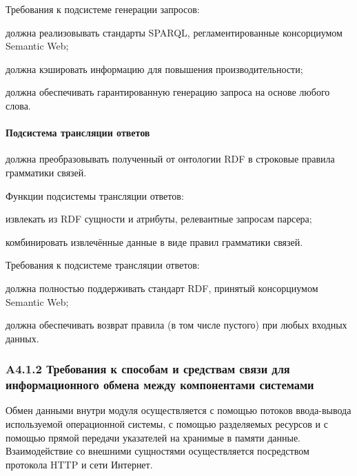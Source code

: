 Требования к подсистеме генерации запросов:
\begin{list}{}{\leftmargin=1.5cm}
  \item должна реализовывать стандарты SPARQL, регламентированные консорциумом Semantic Web;
  \item должна кэшировать информацию для повышения производительности;
  \item должна обеспечивать гарантированную генерацию запроса на основе любого слова.
\end{list}

\paragraph{Подсистема трансляции ответов} должна преобразовывать полученный от онтологии RDF в строковые правила грамматики связей.

Функции подсистемы трансляции ответов:
\begin{list}{}{\leftmargin=1.5cm}
  \item извлекать из RDF сущности и атрибуты, релевантные запросам парсера;
  \item комбинировать извлечённые данные в виде правил грамматики связей.
\end{list}

Требования к подсистеме трансляции ответов:
\begin{list}{}{\leftmargin=1.5cm}
  \item должна полностью поддерживать стандарт RDF, принятый консорциумом Semantic Web;
  \item должна обеспечивать возврат правила (в том числе пустого) при любых входных данных.
\end{list}

\subsubsection*{A4.1.2 Требования к способам и средствам связи для информационного обмена между компонентами системами}
Обмен данными внутри модуля осуществляется с помощью потоков ввода-вывода используемой операционной системы, с помощью разделяемых ресурсов и с помощью прямой передачи указателей на хранимые в памяти данные. Взаимодействие со внешними сущностями осуществляется посредством протокола HTTP и сети Интернет.

